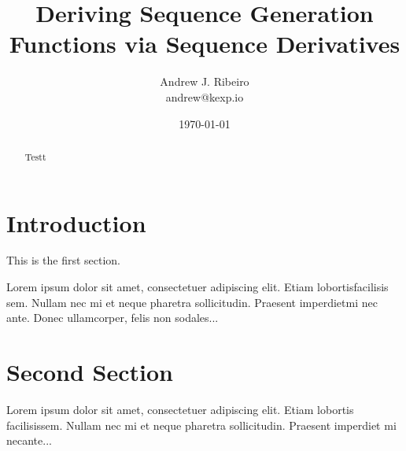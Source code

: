 \documentclass{article}
\title{Deriving Sequence Generation Functions via Sequence Derivatives}
\author{Andrew J. Ribeiro \\ andrew@kexp.io}
\date{\today}
\begin{document}
	
	\maketitle
	
	\begin{abstract}
		Testt
	\end{abstract}

	\section{Introduction}
	
	This is the first section.
	
	Lorem  ipsum  dolor  sit  amet,  consectetuer  adipiscing  
	elit.   Etiam  lobortisfacilisis sem.  Nullam nec mi et 
	neque pharetra sollicitudin.  Praesent imperdietmi nec ante. 
	Donec ullamcorper, felis non sodales...
	
	\section{Second Section}
	
	Lorem ipsum dolor sit amet, consectetuer adipiscing elit.  
	Etiam lobortis facilisissem.  Nullam nec mi et neque pharetra 
	sollicitudin.  Praesent imperdiet mi necante...
	
\end{document}
